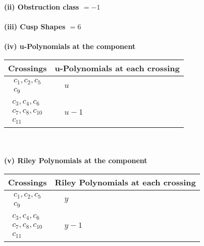 \documentclass[1p]{elsarticle_modified}
\theoremstyle{definition}
\begin{document}
\flushleft \textbf{(ii) Obstruction class $= -1$}\\~\\
\flushleft \textbf{(iii) Cusp Shapes $= 6$}\\~\\
\newpage\renewcommand{\arraystretch}{1}
\flushleft \textbf{(iv) u-Polynomials at the component}\newline \\
\begin{tabular}{m{50pt}|m{274pt}}
Crossings & \hspace{64pt}u-Polynomials at each crossing \\
\hline $$\begin{aligned}c_{1},c_{2},c_{5}\\c_{9}\end{aligned}$$&$\begin{aligned}
&u
\end{aligned}$\\
\hline $$\begin{aligned}c_{3},c_{4},c_{6}\\c_{7},c_{8},c_{10}\\c_{11}\end{aligned}$$&$\begin{aligned}
&u-1
\end{aligned}$\\
\hline
\end{tabular}\\~\\
\newpage\renewcommand{\arraystretch}{1}
\flushleft \textbf{(v) Riley Polynomials at the component}\newline \\
\begin{tabular}{m{50pt}|m{274pt}}
Crossings & \hspace{64pt}Riley Polynomials at each crossing \\
\hline $$\begin{aligned}c_{1},c_{2},c_{5}\\c_{9}\end{aligned}$$&$\begin{aligned}
&y
\end{aligned}$\\
\hline $$\begin{aligned}c_{3},c_{4},c_{6}\\c_{7},c_{8},c_{10}\\c_{11}\end{aligned}$$&$\begin{aligned}
&y-1
\end{aligned}$\\
\hline
\end{tabular}\\~\\
\end{document}
